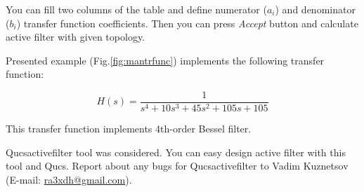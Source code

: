You can fill two columns of the table and define numerator ($a_i$) and
denominator ($b_i$) transfer function coefficients. Then you can press
\emph{Accept} button and calculate active filter with given topology.

Presented example (Fig.\ref{fig:mantrfunc}) implements the following transfer
function:

\begin{equation}
 H(s)=\frac{1}{s^4+10s^3+45s^2+105s+105}
\end{equation}

This transfer function implements 4th-order Bessel filter.



Qucsactivefilter tool was considered. You can easy design active filter with
this tool and Qucs. Report about any bugs  for Qucsactivefilter to Vadim
Kuznetsov (E-mail: \url{ra3xdh@gmail.com}).

